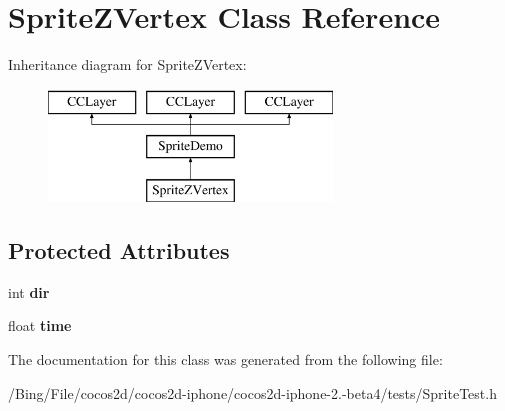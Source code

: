 \hypertarget{interface_sprite_z_vertex}{\section{Sprite\-Z\-Vertex Class Reference}
\label{interface_sprite_z_vertex}
}
Inheritance diagram for Sprite\-Z\-Vertex\-:\begin{figure}[H]
\begin{center}
\leavevmode
\includegraphics[height=3.000000cm]{interface_sprite_z_vertex}
\end{center}
\end{figure}
\subsection*{Protected Attributes}
\begin{DoxyCompactItemize}
\item 
\hypertarget{interface_sprite_z_vertex_add20ffadd7eeb3d6c2c8817fec407093}{int {\bfseries dir}}\label{interface_sprite_z_vertex_add20ffadd7eeb3d6c2c8817fec407093}

\item 
\hypertarget{interface_sprite_z_vertex_aab206d3a003fb7b9a076fb2313601b28}{float {\bfseries time}}\label{interface_sprite_z_vertex_aab206d3a003fb7b9a076fb2313601b28}

\end{DoxyCompactItemize}


The documentation for this class was generated from the following file\-:\begin{DoxyCompactItemize}
\item 
/\-Bing/\-File/cocos2d/cocos2d-\/iphone/cocos2d-\/iphone-\/2.-\/beta4/tests/Sprite\-Test.\-h\end{DoxyCompactItemize}
